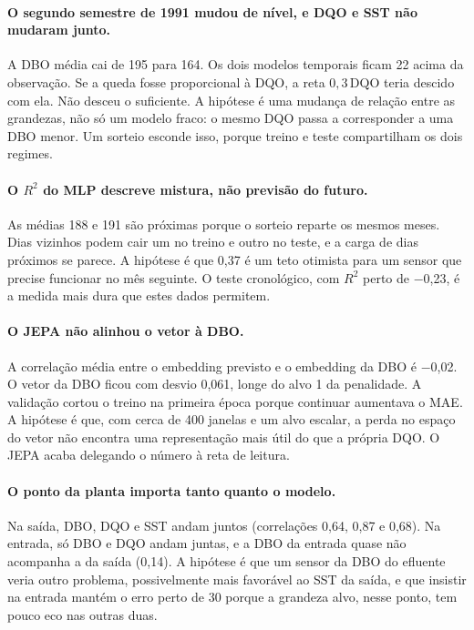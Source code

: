 \documentclass[11pt,a4paper]{article}
\begin{document}
\paragraph{O segundo semestre de 1991 mudou de nível, e DQO e SST não mudaram junto.} A DBO média cai de 195 para 164. Os dois modelos temporais ficam 22 acima da observação. Se a queda fosse proporcional à DQO, a reta \(0{,}3\,\mathrm{DQO}\) teria descido com ela. Não desceu o suficiente. A hipótese é uma mudança de relação entre as grandezas, não só um modelo fraco: o mesmo DQO passa a corresponder a uma DBO menor. Um sorteio esconde isso, porque treino e teste compartilham os dois regimes.

\paragraph{O \(R^{2}\) do MLP descreve mistura, não previsão do futuro.} As médias 188 e 191 são próximas porque o sorteio reparte os mesmos meses. Dias vizinhos podem cair um no treino e outro no teste, e a carga de dias próximos se parece. A hipótese é que 0,37 é um teto otimista para um sensor que precise funcionar no mês seguinte. O teste cronológico, com \(R^{2}\) perto de $-$0,23, é a medida mais dura que estes dados permitem.

\paragraph{O JEPA não alinhou o vetor à DBO.} A correlação média entre o embedding previsto e o embedding da DBO é $-$0,02. O vetor da DBO ficou com desvio 0,061, longe do alvo 1 da penalidade. A validação cortou o treino na primeira época porque continuar aumentava o MAE. A hipótese é que, com cerca de 400 janelas e um alvo escalar, a perda no espaço do vetor não encontra uma representação mais útil do que a própria DQO. O JEPA acaba delegando o número à reta de leitura.

\paragraph{O ponto da planta importa tanto quanto o modelo.} Na saída, DBO, DQO e SST andam juntos (correlações 0,64, 0,87 e 0,68). Na entrada, só DBO e DQO andam juntas, e a DBO da entrada quase não acompanha a da saída (0,14). A hipótese é que um sensor da DBO do efluente veria outro problema, possivelmente mais favorável ao SST da saída, e que insistir na entrada mantém o erro perto de 30 porque a grandeza alvo, nesse ponto, tem pouco eco nas outras duas.
\end{document}
